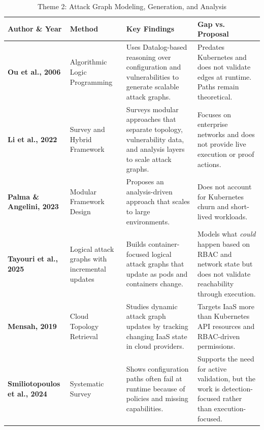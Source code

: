 \documentclass[conference]{IEEEtran}
\begin{document}
\begin{table}[t!]
\centering
\caption{Theme 2: Attack Graph Modeling, Generation, and Analysis}
\label{tab:litmatrix-theme2}
\scriptsize
\setlength{\tabcolsep}{5pt}
\renewcommand{\arraystretch}{1.3}
\begin{tabularx}{\textwidth}{l p{2.6cm} X X}
\toprule
\textbf{Author \& Year} & \textbf{Method} & \textbf{Key Findings} & \textbf{Gap vs. Proposal} \\
\midrule
\textbf{Ou et al., 2006} \cite{ou2006scalable} & Algorithmic Logic Programming & Uses Datalog-based reasoning over configuration and vulnerabilities to generate scalable attack graphs. & Predates Kubernetes and does not validate edges at runtime. Paths remain theoretical. \\
\addlinespace
\textbf{Li et al., 2022} \cite{ibrahim2022strategies} & Survey and Hybrid Framework & Surveys modular approaches that separate topology, vulnerability data, and analysis layers to scale attack graphs. & Focuses on enterprise networks and does not provide live execution or proof actions. \\
\addlinespace
\textbf{Palma \& Angelini, 2023} \cite{bernieri2023scalable} & Modular Framework Design & Proposes an analysis-driven approach that scales to large environments. & Does not account for Kubernetes churn and short-lived workloads. \\
\addlinespace
\textbf{Tayouri et al., 2025} \cite{ditizio2024coral} & Logical attack graphs with incremental updates & Builds container-focused logical attack graphs that update as pods and containers change. & Models what \emph{could} happen based on RBAC and network state but does not validate reachability through execution. \\
\addlinespace
\textbf{Mensah, 2019} \cite{sultan2019generation} & Cloud Topology Retrieval & Studies dynamic attack graph updates by tracking changing IaaS state in cloud providers. & Targets IaaS more than Kubernetes API resources and RBAC-driven permissions. \\
\addlinespace
\textbf{Smiliotopoulos et al., 2024} \cite{sultan2024detecting} & Systematic Survey & Shows configuration paths often fail at runtime because of policies and missing capabilities. & Supports the need for active validation, but the work is detection-focused rather than execution-focused. \\
\bottomrule
\end{tabularx}
\end{table}
\end{document}
